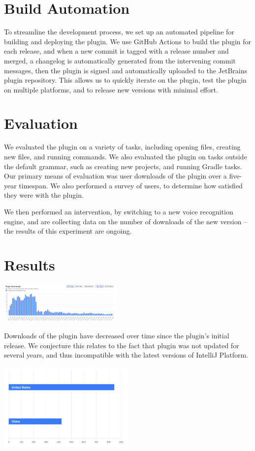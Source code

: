 \documentclass[conference]{IEEEtran}
\begin{document}
\section{Build Automation}

To streamline the development process, we set up an automated pipeline for building and deploying the plugin. We use GitHub Actions to build the plugin for each release, and when a new commit is tagged with a release number and merged, a changelog is automatically generated from the intervening commit messages, then the plugin is signed and automatically uploaded to the JetBrains plugin repository. This allows us to quickly iterate on the plugin, test the plugin on multiple platforms, and to release new versions with minimal effort.

\section{Evaluation}

We evaluated the plugin on a variety of tasks, including opening files, creating new files, and running commands. We also evaluated the plugin on tasks outside the default grammar, such as creating new projects, and running Gradle tasks. Our primary means of evaluation was user downloads of the plugin over a five-year timespan. We also performed a survey of users, to determine how satisfied they were with the plugin.

We then performed an intervention, by switching to a new voice recognition engine, and are collecting data on the number of downloads of the new version -- the results of this experiment are ongoing.

\section{Results}

\includegraphics[width=0.45\textwidth]{downloads.png}

Downloads of the plugin have decreased over time since the plugin's initial release. We conjecture this relates to the fact that plugin was not updated for several years, and thus incompatible with the latest versions of IntelliJ Platform.

\includegraphics[width=0.50\textwidth]{demographics.png}
\end{document}
